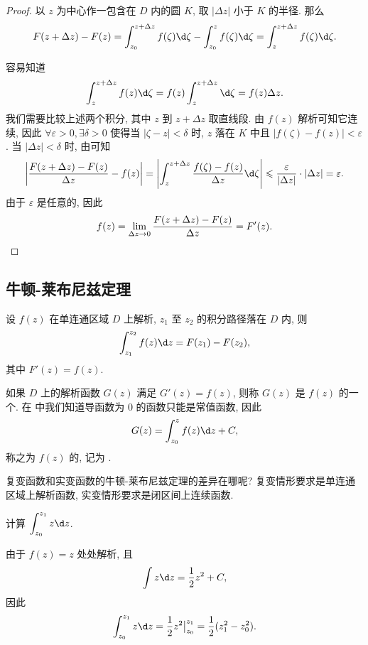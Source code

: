 \begin{proof}
  以 $z$ 为中心作一包含在 $D$ 内的圆 $K$, 取 $|\Delta z|$ 小于 $K$ 的半径.
  那么
  \[
     F(z+\Delta z)-F(z)
    =\int_{z_0}^{z+\Delta z}f(\zeta)\d\zeta-\int_{z_0}^zf(\zeta)\d\zeta
    =\int_z^{z+\Delta z}f(\zeta)\d\zeta.
  \]

  容易知道
  \[
     \int_z^{z+\Delta z}f(z)\d\zeta
    =f(z)\int_z^{z+\Delta z}\d\zeta=f(z)\Delta z.
  \]
  我们需要比较上述两个积分, 其中 $z$ 到 $z+\Delta z$ 取直线段.
  由 $f(z)$ 解析可知它连续, 因此 $\forall\varepsilon>0,\exists\delta>0$ 使得当 $|\zeta-z|<\delta$ 时, $z$ 落在 $K$ 中且 $|f(\zeta)-f(z)|<\varepsilon$.
  当 $|\Delta z|<\delta$ 时, 由\thmGrowUp 可知
  \[
     \abs{\frac{F(z+\Delta z)-F(z)}{\Delta z}-f(z)}
    =\abs{\int_z^{z+\Delta z}\frac{f(\zeta)-f(z)}{\Delta z}\d \zeta}
    \le\frac{\varepsilon}{|\Delta z|}\cdot|\Delta z|
    =\varepsilon.
  \]
  由于 $\varepsilon$ 是任意的, 因此
  \[
    f(z)=\lim_{\Delta z\rightarrow 0}\frac{F(z+\Delta z)-F(z)}{\Delta z}=F'(z).\qedhere
  \]
\end{proof}


\subsection{牛顿-莱布尼兹定理}

\begin{theorem}[牛顿-莱布尼兹定理]
  设 $f(z)$ 在单连通区域 $D$ 上解析, $z_1$ 至 $z_2$ 的积分路径落在 $D$ 内, 则
  \[
    \int_{z_1}^{z_2}f(z)\d z=F(z_1)-F(z_2),
  \]
  其中 $F'(z)=f(z)$.
\end{theorem}

如果 $D$ 上的解析函数 $G(z)$ 满足 $G'(z)=f(z)$, 则称 $G(z)$ 是 $f(z)$ 的一个.
在 中我们知道导函数为 $0$ 的函数只能是常值函数, 因此
\[
  G(z)=\int_{z_0}^zf(z)\d z+C,
\]
称之为 $f(z)$ 的, 记为 .

复变函数和实变函数的牛顿-莱布尼兹定理的差异在哪呢?
复变情形要求是\alert{单连通区域上解析函数}, 实变情形要求是\alert{闭区间上连续函数}.

\begin{example}
  计算 $\displaystyle\int_{z_0}^{z_1}z\d z$.
\end{example}

\begin{solution}
  由于 $f(z)=z$ 处处解析, 且
  \[
    \int z\d z=\half  z^2+C,
  \]
  因此
  \[
    \int_{z_0}^{z_1}z\d z=\half z^2\big|_{z_0}^{z_1}=\half (z_1^2-z_0^2).
  \]
\end{solution}

